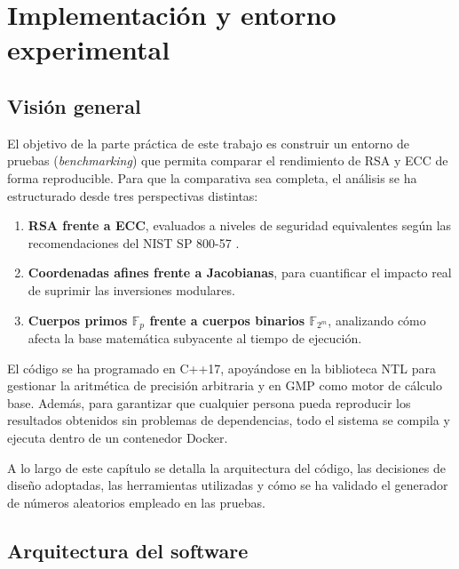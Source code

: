 %

\chapter{Implementación y entorno experimental}
\label{ch:implementacion}

\section{Visión general}
\label{sec:impl-vision}

El objetivo de la parte práctica de este trabajo es construir un entorno de pruebas (\textit{benchmarking}) que permita comparar el rendimiento de RSA y ECC de forma reproducible. 
Para que la comparativa sea completa, el análisis se ha estructurado desde tres perspectivas distintas:

\begin{enumerate}
    \item \textbf{RSA frente a ECC}, evaluados a niveles de seguridad equivalentes según las recomendaciones del NIST SP 800-57 \cite{nist-sp800-57}.
    \item \textbf{Coordenadas afines frente a Jacobianas}, para cuantificar el impacto real de suprimir las inversiones modulares.
    \item \textbf{Cuerpos primos $\mathbb{F}_p$ frente a cuerpos binarios $\mathbb{F}_{2^m}$}, analizando cómo afecta la base matemática subyacente al tiempo de ejecución.
\end{enumerate}

El código se ha programado en C++17, apoyándose en la biblioteca NTL \cite{shoup-ntl} para gestionar la aritmética de precisión arbitraria y en GMP \cite{granlund-gmp} como motor de cálculo base. 
Además, para garantizar que cualquier persona pueda reproducir los resultados obtenidos sin problemas de dependencias, todo el sistema se compila y ejecuta dentro de un contenedor Docker.

A lo largo de este capítulo se detalla la arquitectura del código, las decisiones de diseño adoptadas, las herramientas utilizadas y cómo se ha validado el generador de números aleatorios empleado 
en las pruebas.


\section{Arquitectura del software}
\label{sec:impl-arquitectura}

